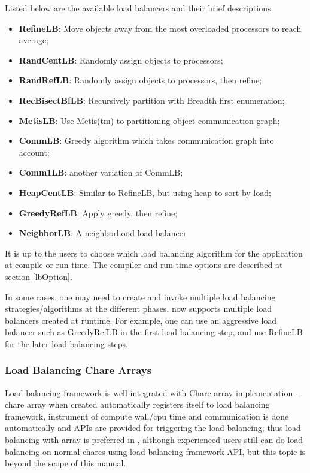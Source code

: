 Listed below are the available load balancers and their brief 
descriptions:
\begin{itemize}
\item {\bf RefineLB}:     Move objects away from the most overloaded processors to reach average;
\item {\bf RandCentLB}:   Randomly assign objects to processors;
\item {\bf RandRefLB}:    Randomly assign objects to processors, then refine;
\item {\bf RecBisectBfLB}:        Recursively partition with Breadth first enumeration;
\item {\bf MetisLB}:      Use Metis(tm) to partitioning object communication graph;
\item {\bf CommLB}:       Greedy algorithm which takes communication graph into account;
\item {\bf Comm1LB}:      another variation of CommLB;
\item {\bf HeapCentLB}:   Similar to RefineLB, but using heap to sort by load;
\item {\bf GreedyRefLB}:  Apply greedy, then refine;
\item {\bf NeighborLB}:   A neighborhood load balancer
\end{itemize}

It is up to the users to choose which load balancing algorithm for the
application at compile or run-time. The compiler and run-time options
are described at section \ref{lbOption}.

In some cases, one may need to create and invoke multiple load balancing
strategies/algorithms at the different phases. \charmpp{} now supports
multiple load balancers created at runtime. For example, one can use 
an aggressive load balancer such as GreedyRefLB in the first load balancing
step, and use RefineLB for the later load balancing steps.

\subsubsection{Load Balancing Chare Arrays}
\label{lbarray}

Load balancing framework is well integrated with Chare array implementation - 
chare array when created automatically registers itself to load balancing
framework, instrument of compute wall/cpu time and communication is 
done automatically and APIs are provided for triggering the load balancing; 
thus load balancing with array is preferred in \charmpp{}, although 
experienced users still can do load balancing on normal chares using load 
balancing framework API, but this topic is beyond the scope of this manual.

